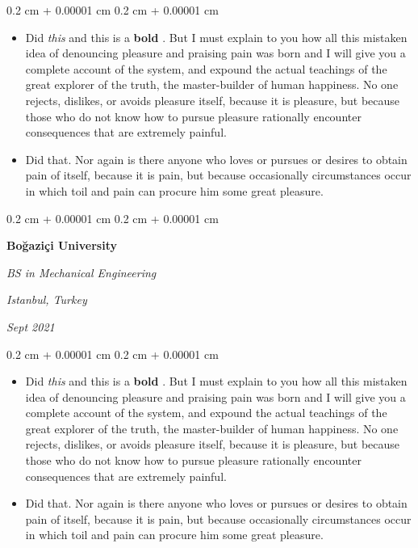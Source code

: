 \documentclass[10pt, letterpaper]{article}
\newenvironment{highlights}{
    \begin{itemize}[
        topsep=0.10 cm,
        parsep=0.10 cm,
        partopsep=0pt,
        itemsep=0pt,
        leftmargin=0.4 cm + 10pt
    ]
}{
    \end{itemize}
} %
\newenvironment{onecolentry}{
    \begin{adjustwidth}{
        0.2 cm + 0.00001 cm
    }{
        0.2 cm + 0.00001 cm
    }
}{
    \end{adjustwidth}
} %
\newenvironment{twocolentry}[2][]{
    \onecolentry
    \def\secondColumn{#2}
    \setcolumnwidth{\fill, 4.5 cm}
    \begin{paracol}{2}
}{
    \switchcolumn \raggedleft \secondColumn
    \end{paracol}
    \endonecolentry
} %
\let\hrefWithoutArrow\href
\renewcommand{\href}[2]{\hrefWithoutArrow{#1}{\ifthenelse{\equal{#2}{}}{ }{#2 }\raisebox{.15ex}{\footnotesize \faExternalLink*}}}
\begin{document}
        \vspace{0.10 cm}
        \begin{onecolentry}
            \begin{highlights}
                \item Did \textit{this} and this is a \textbf{bold} \href{https://example.com}{link}. But I must explain to you how all this mistaken idea of denouncing pleasure and praising pain was born and I will give you a complete account of the system, and expound the actual teachings of the great explorer of the truth, the master-builder of human happiness. No one rejects, dislikes, or avoids pleasure itself, because it is pleasure, but because those who do not know how to pursue pleasure rationally encounter consequences that are extremely painful.
                \item Did that. Nor again is there anyone who loves or pursues or desires to obtain pain of itself, because it is pain, but because occasionally circumstances occur in which toil and pain can procure him some great pleasure.
            \end{highlights}
        \end{onecolentry}


        \vspace{0.2 cm}

        \begin{twocolentry}{
        \textit{Istanbul, Turkey}    
            
        \textit{Sept 2021}}
            \textbf{Boğaziçi University}

            \textit{BS in Mechanical Engineering}
        \end{twocolentry}

        \vspace{0.10 cm}
        \begin{onecolentry}
            \begin{highlights}
                \item Did \textit{this} and this is a \textbf{bold} \href{https://example.com}{link}. But I must explain to you how all this mistaken idea of denouncing pleasure and praising pain was born and I will give you a complete account of the system, and expound the actual teachings of the great explorer of the truth, the master-builder of human happiness. No one rejects, dislikes, or avoids pleasure itself, because it is pleasure, but because those who do not know how to pursue pleasure rationally encounter consequences that are extremely painful.
                \item Did that. Nor again is there anyone who loves or pursues or desires to obtain pain of itself, because it is pain, but because occasionally circumstances occur in which toil and pain can procure him some great pleasure.
            \end{highlights}
        \end{onecolentry}
\end{document}
